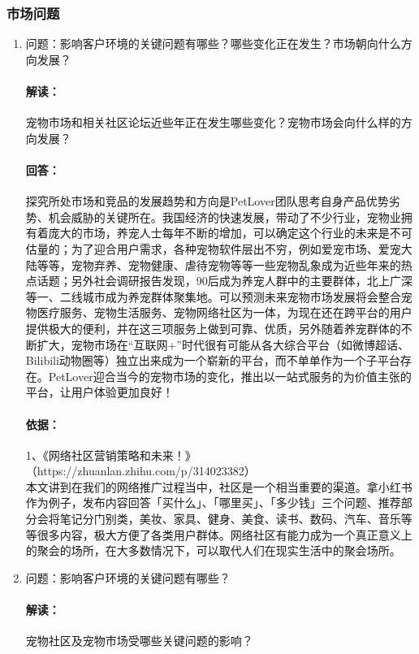 \documentclass[a4paper]{ctexart}
\begin{document}
\subsubsection{市场问题}
\begin{enumerate}[label=\alph*.]
  \item 问题：影响客户环境的关键问题有哪些？哪些变化正在发生？市场朝向什么方向发展？
  \paragraph{解读：}宠物市场和相关社区论坛近些年正在发生哪些变化？宠物市场会向什么样的方向发展？
  \paragraph{回答：}探究所处市场和竞品的发展趋势和方向是PetLover团队思考自身产品优势劣势、机会威胁的关键所在。我国经济的快速发展，带动了不少行业，宠物业拥有着庞大的市场，养宠人士每年不断的增加，可以确定这个行业的未来是不可估量的；为了迎合用户需求，各种宠物软件层出不穷，例如爱宠市场、爱宠大陆等等，宠物弃养、宠物健康、虐待宠物等等一些宠物乱象成为近些年来的热点话题；另外社会调研报告发现，90后成为养宠人群中的主要群体，北上广深等一、二线城市成为养宠群体聚集地。可以预测未来宠物市场发展将会整合宠物医疗服务、宠物生活服务、宠物网络社区为一体，为现在还在跨平台的用户提供极大的便利，并在这三项服务上做到可靠、优质，另外随着养宠群体的不断扩大，宠物市场在“互联网+”时代很有可能从各大综合平台（如微博超话、Bilibili动物圈等）独立出来成为一个崭新的平台，而不单单作为一个子平台存在。PetLover迎合当今的宠物市场的变化，推出以一站式服务的为价值主张的平台，让用户体验更加良好！
  \paragraph{依据：}1、《网络社区营销策略和未来！》\\（https://zhuanlan.zhihu.com/p/314023382）\\
  本文讲到在我们的网络推广过程当中，社区是一个相当重要的渠道。拿小红书作为例子，发布内容回答「买什么」、「哪里买」、「多少钱」三个问题、推荐部分会将笔记分门别类，美妆、家具、健身、美食、读书、数码、汽车、音乐等等很多内容，极大方便了各类用户群体。网络社区有能力成为一个真正意义上的聚会的场所，在大多数情况下，可以取代人们在现实生活中的聚会场所。
  \item 问题：影响客户环境的关键问题有哪些？
  \paragraph{解读：}宠物社区及宠物市场受哪些关键问题的影响？

\end{enumerate}
\end{document}
